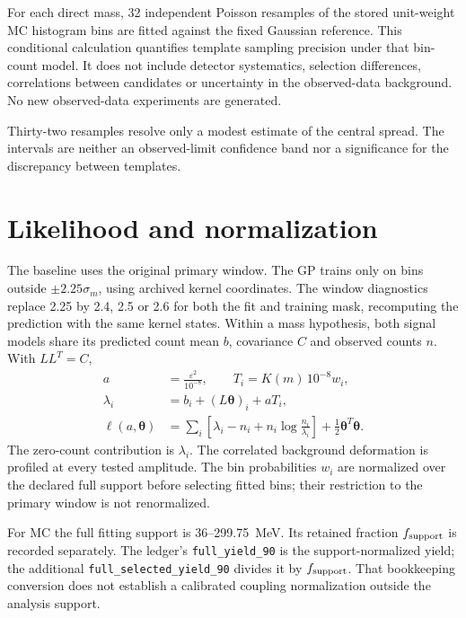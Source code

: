 \documentclass[11pt]{article}
\newcommand{\eps}{\varepsilon}
\begin{document}
For each direct mass, 32 independent Poisson resamples of the stored
unit-weight MC histogram bins are fitted against the fixed Gaussian
reference. This conditional calculation quantifies template sampling
precision under that bin-count model. It does not include detector
systematics, selection differences, correlations between candidates or
uncertainty in the observed-data background. No new observed-data
experiments are generated.

\begin{table}[H]\centering\small

\caption{Conditional finite-MC precision. $R_{16},R_{50},R_{84}$ are
quantiles of the MC-to-Gaussian upper-limit ratio across 32 MC-bin
resamples. The last column is the relative standard deviation of the
resampled limit around its central direct-template scale, in percent.}
\end{table}

Thirty-two resamples resolve only a modest estimate of the central
spread. The intervals are neither an observed-limit confidence band nor
a significance for the discrepancy between templates.

\clearpage
\section{Likelihood and normalization}
The baseline uses the original primary window. The GP trains only on
bins outside $\pm2.25\sigma_m$, using archived kernel coordinates.
The window diagnostics replace 2.25 by 2.4, 2.5 or 2.6 for both the fit
and training mask, recomputing the prediction with the same kernel states.
Within a mass hypothesis, both signal models share its predicted count
mean $b$, covariance $C$ and observed counts $n$. With $LL^T=C$,
\begin{align}
 a&=\frac{\eps^2}{10^{-8}},\qquad T_i=K(m)\,10^{-8}w_i,\\
 \lambda_i&=b_i+(L\bm\theta)_i+a T_i,\\
 \ell(a,\bm\theta)&=\sum_i\left[\lambda_i-n_i+
          n_i\log\frac{n_i}{\lambda_i}\right]
          +\frac12\bm\theta^T\bm\theta .
\end{align}
The zero-count contribution is $\lambda_i$. The correlated background
deformation is profiled at every tested amplitude. The bin probabilities $w_i$ are
normalized over the declared full support before selecting fitted bins;
their restriction to the primary window is not renormalized.

For MC the full fitting support is 36--299.75~MeV. Its retained fraction
$f_{\rm support}$ is recorded separately. The ledger's
\texttt{full\_yield\_90} is the support-normalized yield; the additional
\texttt{full\_selected\_yield\_90} divides it by $f_{\rm support}$.
That bookkeeping conversion does not establish a calibrated coupling
normalization outside the analysis support.
\end{document}
